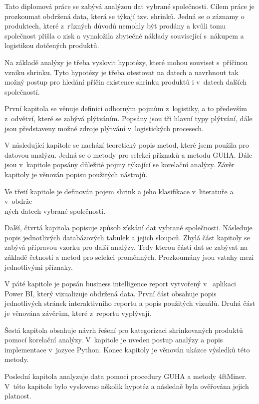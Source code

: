 Tato diplomová práce se zabývá analýzou dat vybrané společnosti. Cílem práce je prozkoumat obdržená data, která se týkají tzv. shrinků. Jedná se o záznamy o produktech, které z~různých důvodů nemohly být prodány a kvůli tomu společnost přišla o zisk a vynaložila zbytečné náklady související s~nákupem a logistikou dotčených produktů. 

Na základě analýzy je třeba vyslovit hypotézy, které mohou souviset s~příčinou vzniku shrinku. Tyto hypotézy je třeba otestovat na datech a navrhnout tak možný postup pro hledání příčin existence shrinku produktů i v~datech dalších společností. 


První kapitola se věnuje definici odborným pojmům z~logistiky, a to především z~odvětví, které se zabývá plýtváním. Popsány jsou tři hlavní typy plýtvání, dále jsou představeny možné zdroje plýtvání v~logistických procesech.

V následující kapitole se nachází teoretický popis metod, které jsem použila pro datovou analýzu. Jedná se o metody pro selekci příznaků a metodu GUHA. Dále jsou v~kapitole popsány důležité pojmy týkající se korelační analýzy. Závěr kapitoly je věnován popisu použitých nástrojů.

Ve třetí kapitole je definován pojem shrink a jeho klasifikace v~literatuře a v~obdrže-\\ných datech vybrané společnosti.

Další, čtvrtá kapitola popisuje způsob získání dat vybrané společnosti. Následuje popis jednotlivých databázových tabulek a jejich sloupců. Zbylá část kapitoly se zabývá přípravou vzorku pro další analýzy. Tedy kterou částí dat se zabývat na základě četnosti a metod pro selekci proměnných. Prozkoumány jsou vztahy mezi jednotlivými příznaky.

V páté kapitole je popsán business intelligence report vytvořený v~ aplikaci Power BI, který vizualizuje obdržená data. První část obsahuje popis jednotlivých stránek interaktivního reportu a popis použitých vizuálů. Druhá část je věnována závěrům, které z~reportu vyplývají.

Šestá kapitola obsahuje návrh řešení pro kategorizaci shrinkovaných produktů pomocí korelační analýzy. V~kapitole je uveden postup analýzy a popis implementace v~jazyce Python. Konec kapitoly je věnován ukázce výsledků této metody.

Poslední kapitola analyzuje data pomocí procedury GUHA a metody 4ftMiner. V~této kapitole bylo vysloveno několik hypotéz a následně byla ověřována jejich platnost.






